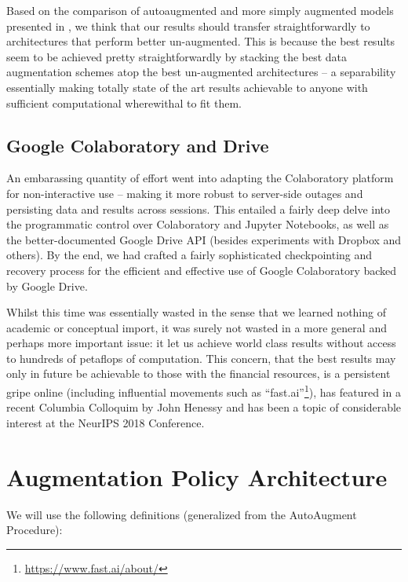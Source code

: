 \documentclass[10pt,twocolumn,letterpaper]{article}
\begin{document}
		Based on the comparison of autoaugmented and more simply augmented models presented in \cite{Cubuk2018}, we think that our results should transfer straightforwardly to architectures that perform better un-augmented. This is because the best results seem to be achieved pretty straightforwardly by stacking the best data augmentation schemes atop the best un-augmented architectures -- a separability essentially making totally state of the art results achievable to anyone with sufficient computational wherewithal to fit them.


	\subsection{Google Colaboratory and Drive}
		An embarassing quantity of effort went into adapting the Colaboratory platform for non-interactive use -- making it more robust to server-side outages and persisting data and results across sessions. This entailed a fairly deep delve into the programmatic control over Colaboratory and Jupyter Notebooks, as well as the better-documented Google Drive API (besides experiments with Dropbox and others). By the end, we had crafted a fairly sophisticated checkpointing and recovery process for the efficient and effective use of Google Colaboratory backed by Google Drive.

		Whilst this time was essentially wasted in the sense that we learned nothing of academic or conceptual import, it was surely not wasted in a more general and perhaps more important issue: it let us achieve world class results without access to hundreds of petaflops of computation. This concern, that the best results may only in future be achievable to those with the financial resources, is a persistent gripe online (including influential movements such as ``fast.ai''\footnote{\url{https://www.fast.ai/about/}}), has featured in a recent Columbia Colloquim by John Henessy and has been a topic of considerable interest at the NeurIPS 2018 Conference. %

\section{Augmentation Policy Architecture}
	We will use the following definitions (generalized from the AutoAugment Procedure):
\end{document}
